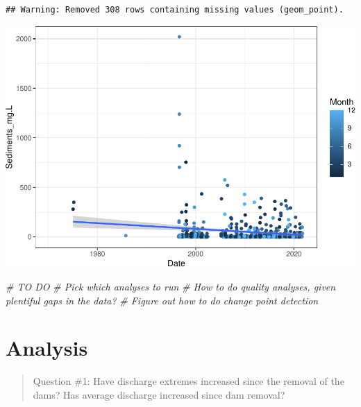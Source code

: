 \documentclass[
  12pt,
]{article}
\newenvironment{Shaded}{\begin{snugshade}}{\end{snugshade}}
\newcommand{\CommentTok}[1]{\textcolor[rgb]{0.56,0.35,0.01}{\textit{#1}}}
\begin{document}
\begin{verbatim}
## Warning: Removed 308 rows containing missing values (geom_point).
\end{verbatim}

\includegraphics{Project_Template_files/figure-latex/unnamed-chunk-1-5.pdf}

\begin{Shaded}
\begin{Highlighting}[]
\CommentTok{\# TO DO}
\CommentTok{\# Pick which analyses to run}
\CommentTok{\# How to do quality analyses, given plentiful gaps in the data?}
\CommentTok{\# Figure out how to do change point detection}
\end{Highlighting}
\end{Shaded}

\newpage

\hypertarget{analysis}{%
\section{Analysis}\label{analysis}}

\begin{quote}
Question \#1: Have discharge extremes increased since the removal of the
dams? Has average discharge increased since dam removal?
\end{quote}
\end{document}
